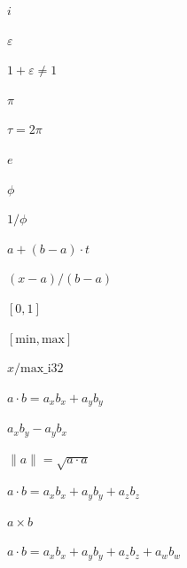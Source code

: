 \documentclass{article}
\begin{document}
$i$
\pagebreak

$\varepsilon$
\pagebreak

$1+\varepsilon \neq 1$
\pagebreak

$\pi$
\pagebreak

$\tau = 2\pi$
\pagebreak

$e$
\pagebreak

$\phi$
\pagebreak

$1/\phi$
\pagebreak

$a + (b - a) \cdot t$
\pagebreak

$(x - a)/(b - a)$
\pagebreak

$[0, 1]$
\pagebreak

$[\text{min}, \text{max}]$
\pagebreak

$x / \text{max\_i32}$
\pagebreak

$a \cdot b = a_x b_x + a_y b_y$
\pagebreak

$a_x b_y - a_y b_x$
\pagebreak

$\|a\| = \sqrt{a \cdot a}$
\pagebreak

$a \cdot b = a_x b_x + a_y b_y + a_z b_z$
\pagebreak

$a \times b$
\pagebreak

$a \cdot b = a_x b_x + a_y b_y + a_z b_z + a_w b_w$
\pagebreak
\end{document}
